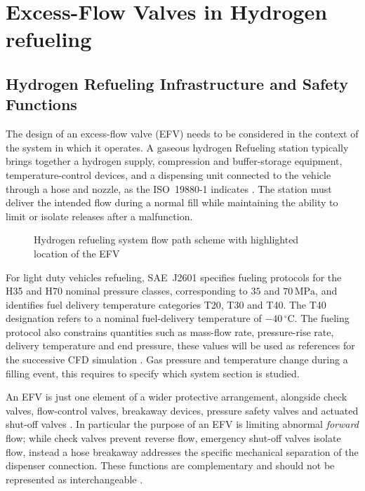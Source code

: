 \chapter{Excess-Flow Valves in Hydrogen refueling}
\label{ch:efv_operation}

\section{Hydrogen Refueling Infrastructure and Safety Functions}
\label{sec:Refueling_context}

The design of an excess-flow valve (EFV) needs to be considered in the context of the system in which it operates. A gaseous hydrogen Refueling station typically brings together a hydrogen supply, compression and buffer-storage equipment, temperature-control devices, and a dispensing unit connected to the vehicle through a hose and nozzle, as the ISO~19880-1 indicates \cite{iso19880_1}. The station must deliver the intended flow during a normal fill while maintaining the ability to limit or isolate releases after a malfunction.


\begin{figure}[htbp]
\centering
\resizebox{\textwidth}{!}{}
\caption{Hydrogen refueling system flow path scheme with highlighted location of the EFV}
\label{fig:station_efv_location}
\end{figure}

For light duty vehicles refueling, SAE~J2601 specifies fueling protocols for the H35 and H70 nominal pressure classes, corresponding to $35$ and $70\,\mathrm{MPa}$, and identifies fuel delivery temperature categories T20, T30 and T40. The T40 designation refers to a nominal fuel-delivery temperature of $-40\,^{\circ}\mathrm{C}$. The fueling protocol also constrains quantities such as mass-flow rate, pressure-rise rate, delivery temperature and end pressure, these values will be used as references for the successive CFD simulation \cite{sae_j2601}. Gas pressure and temperature change during a filling event, this requires to specify which system section is studied.

An EFV is just one element of a wider protective arrangement, alongside check valves, flow-control valves, breakaway devices, pressure safety valves and actuated shut-off valves \cite{iso19880_3}. 
In particular the purpose of an EFV is limiting abnormal \emph{forward} flow; while check valves prevent reverse flow, emergency shut-off valves isolate flow, instead a hose breakaway addresses the specific mechanical separation of the dispenser connection. These functions are complementary and should not be represented as interchangeable \cite{iso19880_1,iso19880_3,h2tools_valves}.

